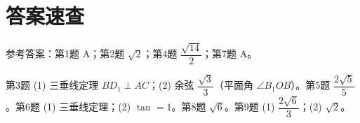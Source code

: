 \documentclass{exam-zh}
\begin{document}
\clearpage
\section*{答案速查}


\begin{question}[points=0]
  参考答案：第1题 A；第2题 $\sqrt2$；第4题 $\dfrac{\sqrt{14}}{2}$；第7题 A。

  \paren[—]
\end{question}



\begin{question}[points=0]
  第3题 (1) 三垂线定理 $BD_1\perp AC$；(2) 余弦 $\dfrac{\sqrt3}{3}$（平面角 $\angle B_1OB$）。第5题 $\dfrac{2\sqrt5}{5}$。第6题 (1) 三垂线定理；(2) $\tan=1$。第8题 $\sqrt6$。第9题 (1) $\dfrac{2\sqrt6}{3}$；(2) $\sqrt2$。

  \paren[—]
\end{question}
\end{document}
